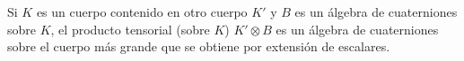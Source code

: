 \begin{ejemploMatrices}
\end{ejemploMatrices}

Si $K$ es un cuerpo contenido en otro cuerpo $K'$ y $B$ es un \'{a}lgebra
de cuaterniones sobre $K$, el producto tensorial (sobre $K$)
$K'\otimes B$ es un \'{a}lgebra de cuaterniones sobre el cuerpo m\'{a}s
grande que se obtiene por extensi\'{o}n de escalares.

